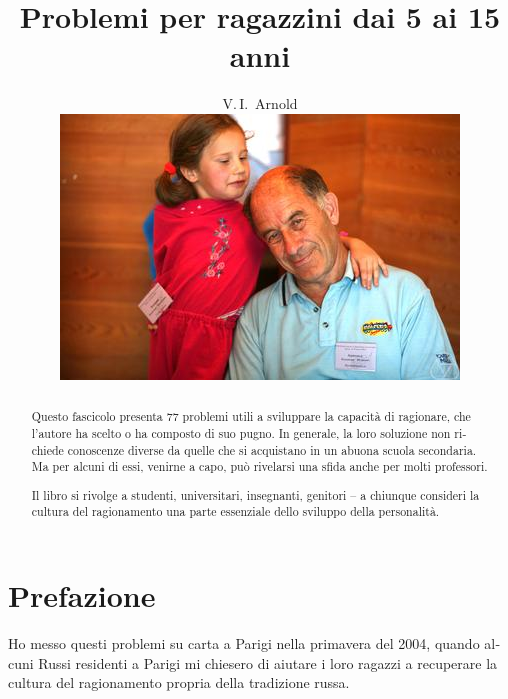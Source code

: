 
\setdefaultlanguage[babelshorthands = false]{italian}

\title{Problemi per ragazzini dai 5 ai 15 anni}

\author{V.\,I.~Arnold
\vspace*{2cm}\\ 
\includegraphics[width=\linewidth]{resources/photo-arnold_small}
}
\date{}


\maketitle
\thispagestyle{empty}
\cleardoublepage 
\setcounter{page}{1}
\begin{abstract}
Questo fascicolo presenta 77 problemi utili a sviluppare la capacità di ragionare, che l’autore ha scelto o ha composto di suo pugno. In generale, la loro soluzione non richiede conoscenze diverse da quelle che si acquistano in un abuona scuola secondaria. Ma per alcuni di essi, venirne a capo, può rivelarsi una sfida anche per molti professori.

Il libro si rivolge a studenti, universitari, insegnanti, genitori – a chiunque consideri la cultura del ragionamento una parte essenziale dello sviluppo della personalità.
\end{abstract}
\clearpage 

\section*{Prefazione}
Ho messo questi problemi su carta a Parigi nella primavera del 2004, quando alcuni Russi residenti a Parigi mi chiesero di aiutare i loro ragazzi a recuperare la cultura del ragionamento propria della tradizione russa.

